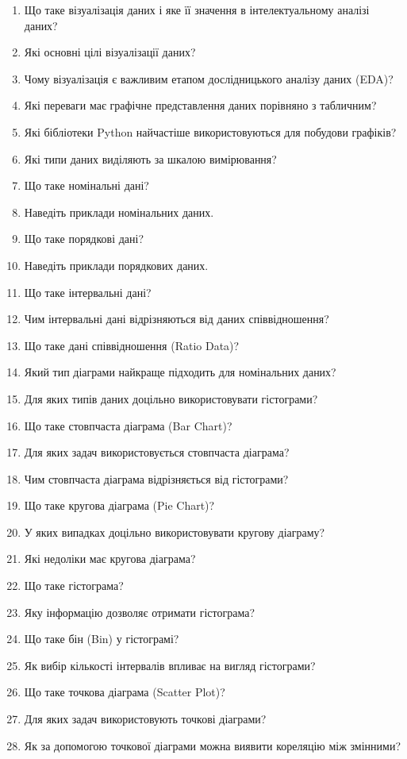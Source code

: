 \begin{enumerate}
\item Що таке візуалізація даних і яке її значення в інтелектуальному аналізі даних?
\item Які основні цілі візуалізації даних?
\item Чому візуалізація є важливим етапом дослідницького аналізу даних (EDA)?
\item Які переваги має графічне представлення даних порівняно з табличним?
\item Які бібліотеки Python найчастіше використовуються для побудови графіків?
\item Які типи даних виділяють за шкалою вимірювання?
\item Що таке номінальні дані?
\item Наведіть приклади номінальних даних.
\item Що таке порядкові дані?
\item Наведіть приклади порядкових даних.
\item Що таке інтервальні дані?
\item Чим інтервальні дані відрізняються від даних співвідношення?
\item Що таке дані співвідношення (Ratio Data)?
\item Який тип діаграми найкраще підходить для номінальних даних?
\item Для яких типів даних доцільно використовувати гістограми?
\item Що таке стовпчаста діаграма (Bar Chart)?
\item Для яких задач використовується стовпчаста діаграма?
\item Чим стовпчаста діаграма відрізняється від гістограми?
\item Що таке кругова діаграма (Pie Chart)?
\item У яких випадках доцільно використовувати кругову діаграму?
\item Які недоліки має кругова діаграма?
\item Що таке гістограма?
\item Яку інформацію дозволяє отримати гістограма?
\item Що таке бін (Bin) у гістограмі?
\item Як вибір кількості інтервалів впливає на вигляд гістограми?
\item Що таке точкова діаграма (Scatter Plot)?
\item Для яких задач використовують точкові діаграми?
\item Як за допомогою точкової діаграми можна виявити кореляцію між змінними?

\end{enumerate}
